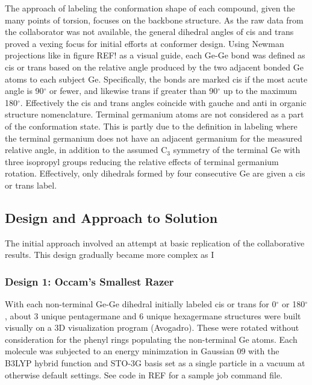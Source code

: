 The approach of labeling the conformation shape of each compound, given the many points of torsion, focuses on the backbone structure. 
As the raw data from the collaborator was not available, the general dihedral angles of cis and trans proved a vexing focus for initial efforts at conformer design.
Using Newman projections like in figure 
REF!
as a visual guide, each Ge-Ge bond was defined as cis or trans based on the relative angle produced by the two  adjacent bonded Ge atoms to each subject Ge.
Specifically, the bonds are marked cis if the most acute angle is 90$^{\circ}$ or fewer, and likewise trans if greater than 90$^{\circ}$ up to the maximum 180$^{\circ}$.
Effectively the cis and trans angles coincide with gauche and anti in organic structure nomenclature.
Terminal germanium atoms are not considered as a part of the conformation state. 
This is partly due to the definition in labeling where the terminal germanium does not have an adjacent germanium for the measured relative angle, in addition to the assumed 
C$_{3}$
symmetry of the terminal Ge with three isopropyl groups reducing the relative effects of terminal germanium rotation.
Effectively, only dihedrals formed by four consecutive Ge are given a cis or trans label.

\subsection{Design and Approach to Solution}

The initial approach involved an attempt at basic replication of the collaborative results.
This design gradually became more complex as I

\subsubsection{Design 1: Occam's Smallest Razer}

With each non-terminal Ge-Ge dihedral initially labeled cis or trans for 0$^{\circ}$ or 180$^{\circ}$, about 3 unique pentagermane and 6 unique hexagermane structures were built visually on a 3D visualization program (Avogadro).
These were rotated without consideration for the phenyl rings populating the non-terminal Ge atoms.
Each molecule was subjected to an energy minimzation in Gaussian 09 with the B3LYP hybrid function and STO-3G basis set as a single particle in a vacuum at otherwise default settings. 
See code in 
REF
for a sample job command file.

